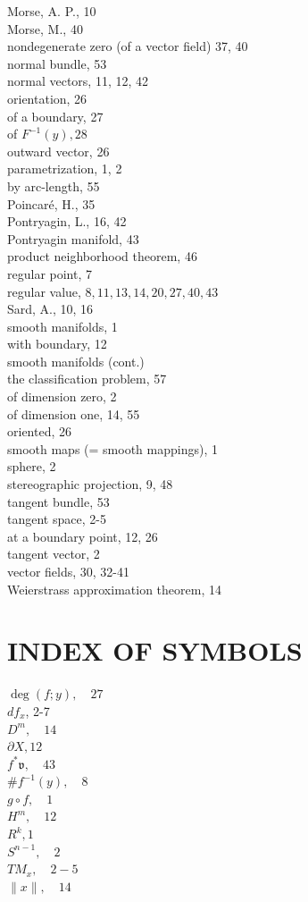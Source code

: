 \documentclass[10pt, letterpaper]{article}
\begin{document}
Morse, A. P., 10\\
Morse, M., 40\\
nondegenerate zero (of a vector field) 37, 40\\
normal bundle, 53\\
normal vectors, 11, 12, 42\\
orientation, 26\\
of a boundary, 27\\
of $F^{-1}(y), 28$\\
outward vector, 26\\
parametrization, 1, 2\\
by arc-length, 55\\
Poincaré, H., 35\\
Pontryagin, L., 16, 42\\
Pontryagin manifold, 43\\
product neighborhood theorem, 46\\
regular point, 7\\
regular value, $8,11,13,14,20,27,40,43$\\
Sard, A., 10, 16\\
smooth manifolds, 1\\
with boundary, 12\\
smooth manifolds (cont.)\\
the classification problem, 57\\
of dimension zero, 2\\
of dimension one, 14, 55\\
oriented, 26\\
smooth maps (= smooth mappings), 1\\
sphere, 2\\
stereographic projection, 9, 48\\
tangent bundle, 53\\
tangent space, 2-5\\
at a boundary point, 12, 26\\
tangent vector, 2\\
vector fields, 30, 32-41\\
Weierstrass approximation theorem, 14

\section*{INDEX OF SYMBOLS}
$\operatorname{deg}(f ; y), \quad 27$\\
$d f_{x}$, 2-7\\
$D^{m}, \quad 14$\\
$\partial X, 12$\\
$f^{*} \mathfrak{v}, \quad 43$\\
$\# f^{-1}(y), \quad 8$\\
$g \circ f, \quad 1$\\
$H^{m}, \quad 12$\\
$R^{k}, 1$\\
$S^{n-1}, \quad 2$\\
$T M_{x}, \quad 2-5$\\
$\|x\|, \quad 14$
\end{document}
